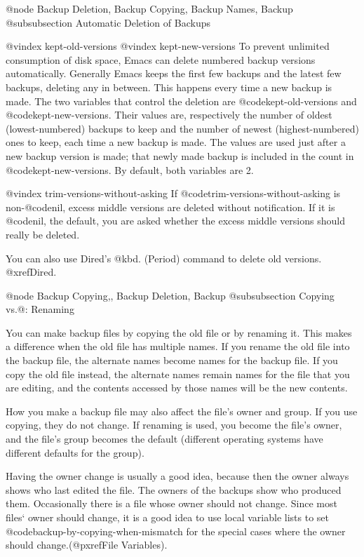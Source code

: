 {{{{{{{{{{{{{{{{{@node Backup Deletion, Backup Copying, Backup Names, Backup
@subsubsection Automatic Deletion of Backups

@vindex kept-old-versions
@vindex kept-new-versions
  To prevent unlimited consumption of disk space, Emacs can delete numbered
backup versions automatically.  Generally Emacs keeps the first few backups
and the latest few backups, deleting any in between.  This happens every
time a new backup is made.  The two variables that control the deletion are
@code{kept-old-versions} and @code{kept-new-versions}.  Their values are, respectively
the number of oldest (lowest-numbered) backups to keep and the number of
newest (highest-numbered) ones to keep, each time a new backup is made.
The values are used just after a new backup version is made;
that newly made backup is included in the count in @code{kept-new-versions}.
By default, both variables are 2.

@vindex trim-versions-without-asking
  If @code{trim-versions-without-asking} is non-@code{nil},  excess
middle versions are deleted without notification.  If it is @code{nil}, the
default, you are asked whether the excess middle versions should
really be deleted.

  You can also use Dired's @kbd{.} (Period) command to delete old versions.
@xref{Dired}.

@node Backup Copying,, Backup Deletion, Backup
@subsubsection Copying vs.@: Renaming

  You can make backup files by copying the old file or by renaming it.
This makes a difference when the old file has multiple names.  If you
rename the old file into the backup file, the alternate names
become names for the backup file.  If you copy the old file instead,
the alternate names remain names for the file that you are editing,
and the contents accessed by those names will be the new contents.

  How you make a backup file may also affect the file's owner
and group.  If you use copying, they do not change.  If renaming is used,
you become the file's owner, and the file's group becomes the default
(different operating systems have different defaults for the group).

  Having the owner change is usually a good idea, because then the owner
always shows who last edited the file.  The owners of the backups show
who produced them.  Occasionally there is a file whose owner should not
change.  Since most files` owner should change, it is a good idea to use
local variable lists to set @code{backup-by-copying-when-mismatch} for
the special cases where the owner should change.(@pxref{File
Variables}).

}}}}}}}}}}}}}}}}}

